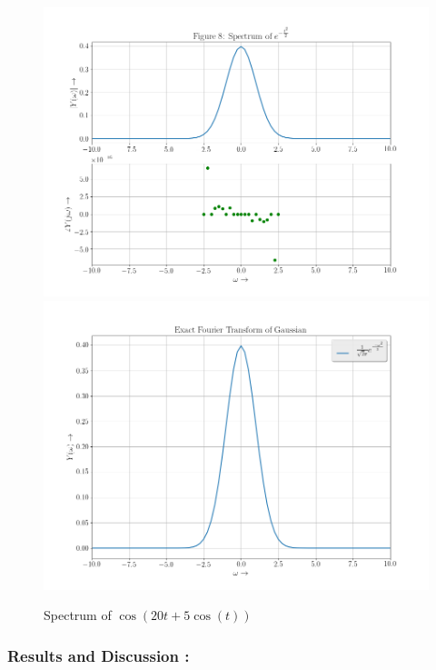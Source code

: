 \documentclass[11pt, a4paper]{article}
\begin{document}
   \begin{figure}[!tbh]
     \centering
     \includegraphics[scale=0.4]{./../Extras/fig9-8.png}  %
     \includegraphics[scale=0.4]{./../Extras/fig9-9.png}  %
     \caption{Spectrum of $\cos(20t+5\cos(t))$}
   \end{figure}
   
   \newpage
   
		
   \subsubsection{Results and Discussion :}\label{results-and-discussion}
\end{document}
